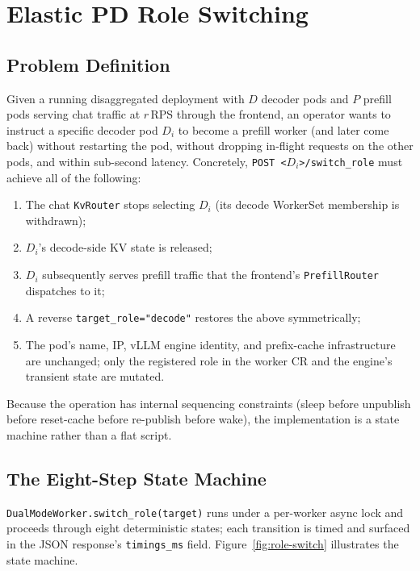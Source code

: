 \documentclass[10pt,twocolumn,letterpaper]{article}
\begin{document}
\section{Elastic PD Role Switching}
\label{sec:role-switch}

\subsection{Problem Definition}
\label{sec:switch-problem}

Given a running disaggregated deployment with $D$ decoder pods and $P$ prefill pods serving chat traffic at $r$\,RPS through the frontend, an operator wants to instruct a specific decoder pod $D_i$ to become a prefill worker (and later come back) without restarting the pod, without dropping in-flight requests on the other pods, and within sub-second latency. Concretely, \texttt{POST~<$D_i$>/switch\_role} must achieve all of the following:

\begin{enumerate}[nosep]
\item The chat \texttt{KvRouter} stops selecting $D_i$ (its decode WorkerSet membership is withdrawn);
\item $D_i$'s decode-side KV state is released;
\item $D_i$ subsequently serves prefill traffic that the frontend's \texttt{PrefillRouter} dispatches to it;
\item A reverse \texttt{target\_role="decode"} restores the above symmetrically;
\item The pod's name, IP, vLLM engine identity, and prefix-cache infrastructure are unchanged; only the registered role in the worker CR and the engine's transient state are mutated.
\end{enumerate}

Because the operation has internal sequencing constraints (sleep before unpublish before reset-cache before re-publish before wake), the implementation is a state machine rather than a flat script.

\subsection{The Eight-Step State Machine}
\label{sec:state-machine}

\texttt{DualModeWorker.switch\_role(target)} runs under a per-worker async lock and proceeds through eight deterministic states; each transition is timed and surfaced in the JSON response's \texttt{timings\_ms} field. Figure~\ref{fig:role-switch} illustrates the state machine.
\end{document}
